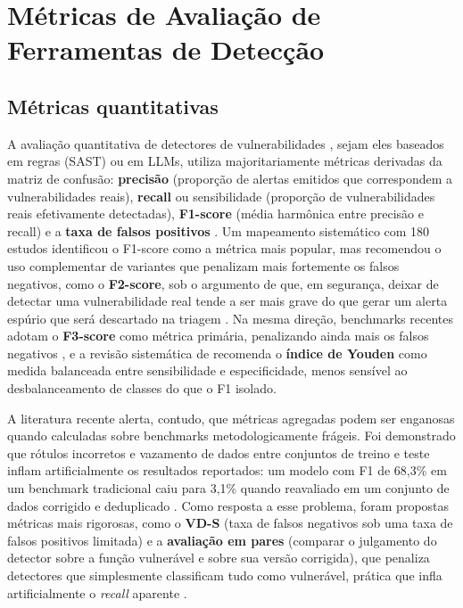 \section{Métricas de Avaliação de Ferramentas de Detecção}\label{sec:metricas-avaliacao}
\subsection{Métricas quantitativas}\label{subsec:metricas-quantitativas}
A avaliação quantitativa de detectores de vulnerabilidades , sejam eles baseados em regras (SAST) ou em LLMs, utiliza majoritariamente métricas derivadas da matriz de confusão: \textbf{precisão} (proporção de alertas emitidos que correspondem a vulnerabilidades reais), \textbf{recall} ou sensibilidade (proporção de vulnerabilidades reais efetivamente detectadas), \textbf{F1-score} (média harmônica entre precisão e recall) e a \textbf{taxa de falsos positivos} \cite{Kalouptsoglou2023VulnPrediction, Esposito2024SASTComparison}. Um mapeamento sistemático com 180 estudos identificou o F1-score como a métrica mais popular, mas recomendou o uso complementar de variantes que penalizam mais fortemente os falsos negativos, como o \textbf{F2-score}, sob o argumento de que, em segurança, deixar de detectar uma vulnerabilidade real tende a ser mais grave do que gerar um alerta espúrio que será descartado na triagem \cite{Kalouptsoglou2023VulnPrediction}. Na mesma direção, benchmarks recentes adotam o \textbf{F3-score} como métrica primária, penalizando ainda mais os falsos negativos \cite{Pellew2026RealVuln}, e a revisão sistemática de  recomenda o \textbf{índice de Youden} como medida balanceada entre sensibilidade e especificidade, menos sensível ao desbalanceamento de classes do que o F1 isolado.

A literatura recente alerta, contudo, que métricas agregadas podem ser enganosas quando calculadas sobre benchmarks metodologicamente frágeis. Foi demonstrado que rótulos incorretos e vazamento de dados entre conjuntos de treino e teste inflam artificialmente os resultados reportados: um modelo com F1 de 68,3\% em um benchmark tradicional caiu para 3,1\% quando reavaliado em um conjunto de dados corrigido e deduplicado \cite{Ding2025CodeLMVuln}. Como resposta a esse problema, foram propostas métricas mais rigorosas, como o \textbf{VD-S} (taxa de falsos negativos sob uma taxa de falsos positivos limitada) e a \textbf{avaliação em pares} (comparar o julgamento do detector sobre a função vulnerável e sobre sua versão corrigida), que penaliza detectores que simplesmente classificam tudo como vulnerável, prática que infla artificialmente o \textit{recall} aparente \cite{Ding2025CodeLMVuln, Yildiz2025LLMAgents}.


